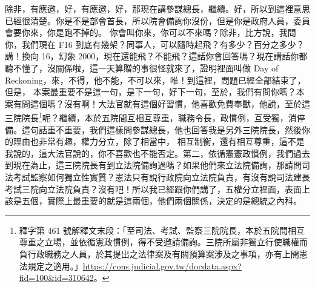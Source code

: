 \hypertarget{c08:cue:211}{}除非，有應邀，好，有應邀，好，那現在講參謀總長，繼續。好，所以到這裡意思已經很清楚。你是不是部會首長，所以院會備詢你沒份，但是你是政府人員，委員會要你來，你是跑不掉的。
\hypertarget{c08:cue:212}{}你會叫你來，你可以不來嗎？除非，比方說，我問你，我們現在 F16 到底有幾架？同事人，可以隨時起飛？有多少？百分之多少？講！換向 16，幻象 2000，現在還能飛？不能飛？這話你會回答嗎？現在講話你都聽不懂了，沒關係啦，這一天算贈的事很怪就來了，證明裡面叫做 Day of Reckoning，來，不得，他不能，不可以來，唯！到這裡，問題已經全部結束了，但是，
\hypertarget{c08:cue:213}{}本案最重要不是這一句，是下一句，好下一句，至於，我們有問你嗎？本案有問這個嗎？沒有啊！大法官就有這個好習慣，他喜歡免費奉獸，他說，至於這三院院長\footnote{釋字第 461 號解釋文末段：「至司法、考試、監察三院院長，本於五院間相互尊重之立場，並依循憲政慣例，得不受邀請備詢。三院所屬非獨立行使職權而負行政職務之人員，於其提出之法律案及有關預算案涉及之事項，亦有上開憲法規定之適用。」\url{https://cons.judicial.gov.tw/docdata.aspx?fid=100&id=310642}。}呢？繼續，本於五院間互相互尊重，職務令長，政慣例，互受獨，消停備。這句話重不重要，我們這樣問參謀總長，他也回答我是另外三院院長，然後你的理由也非常有趣，權力分立，除了相當中，
\hypertarget{c08:cue:214}{}相互制衡，還有相互尊重，這不是我說的，這大法官說的，你不喜歡也不能否定。第二，依循憲憲政慣例，我們過去到現在為止，這三院院長有到立法院備詢過嗎？如果他們來立法院備詢，那請問司法考試監察如何獨立性實質？憲法只有說行政院向立法院負責，有沒有說司法建長考試三院向立法院負責？沒有吧！所以我已經跟你們講了，五權分立裡面，表面上該是五個，實際上最重要的就是這兩個，他們兩個關係，決定的是總統之內科。


